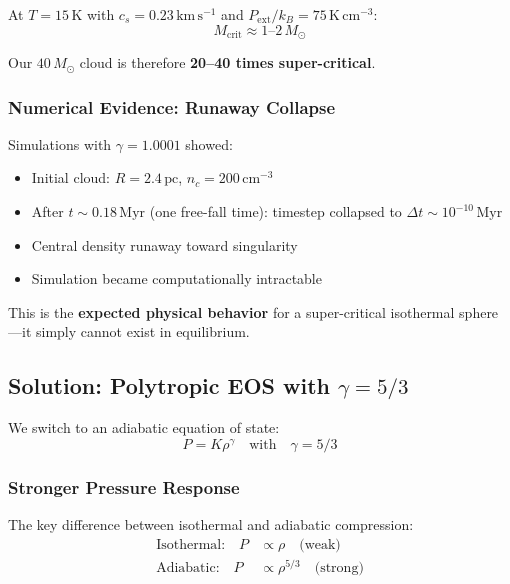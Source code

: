 \documentclass[11pt,a4paper]{article}
\newcommand{\Msun}{M_\odot}
\newcommand{\kms}{\,\mathrm{km\,s^{-1}}}
\newcommand{\pc}{\,\mathrm{pc}}
\newcommand{\cmcubed}{\,\mathrm{cm^{-3}}}
\begin{document}
At $T = 15\,\mathrm{K}$ with $c_s = 0.23\kms$ and $P_\mathrm{ext}/k_B = 75\,\mathrm{K\,cm^{-3}}$:
\begin{equation}
    M_\mathrm{crit} \approx 1\text{--}2\,\Msun
\end{equation}

Our $40\,\Msun$ cloud is therefore \textbf{20--40 times super-critical}.

\subsubsection{Numerical Evidence: Runaway Collapse}

Simulations with $\gamma = 1.0001$ showed:
\begin{itemize}
    \item Initial cloud: $R = 2.4\pc$, $n_c = 200\cmcubed$
    \item After $t \sim 0.18\,\mathrm{Myr}$ (one free-fall time): timestep collapsed to $\Delta t \sim 10^{-10}\,\mathrm{Myr}$
    \item Central density runaway toward singularity
    \item Simulation became computationally intractable
\end{itemize}

This is the \textbf{expected physical behavior} for a super-critical isothermal sphere---it
simply cannot exist in equilibrium.

\subsection{Solution: Polytropic EOS with $\gamma = 5/3$}

We switch to an adiabatic equation of state:
\begin{equation}
    P = K \rho^\gamma \quad \text{with} \quad \gamma = 5/3
\end{equation}

\subsubsection{Stronger Pressure Response}

The key difference between isothermal and adiabatic compression:
\begin{align}
    \text{Isothermal:} \quad P &\propto \rho \quad \text{(weak)} \\
    \text{Adiabatic:} \quad P &\propto \rho^{5/3} \quad \text{(strong)}
\end{align}
\end{document}
